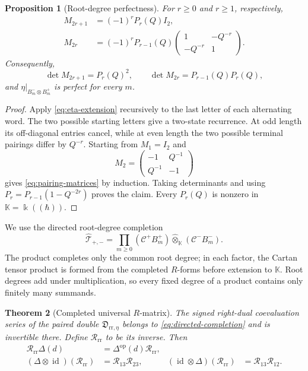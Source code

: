 \documentclass[11pt,a4paper]{article}
\newcommand{\kk}{\Bbbk}
\newcommand{\hK}{\mathbb K}
\newcommand{\ot}{\otimes}
\newcommand{\hot}{\widehat\otimes}
\newcommand{\id}{\operatorname{id}}
\newtheorem{theorem}{Theorem}[section]
\newtheorem{proposition}[theorem]{Proposition}
\theoremstyle{definition}
\theoremstyle{remark}
\begin{document}
\begin{proposition}[Root-degree perfectness]\label{prop:perfect-pairing}
For \(r\geq0\) and \(r\geq1\), respectively,
\begin{equation}\label{eq:pairing-matrices}
\begin{aligned}
 M_{2r+1}&=(-1)^rP_r(Q)I_2,\\
 M_{2r}&=(-1)^rP_{r-1}(Q)
 \begin{pmatrix}1&-Q^{-r}\\-Q^{-r}&1\end{pmatrix}.
\end{aligned}
\end{equation}
Consequently,
\[
 \det M_{2r+1}=P_r(Q)^2,\qquad
 \det M_{2r}=P_{r-1}(Q)P_r(Q),
\]
and \(\eta|_{B_m^-\ot B_m^+}\) is perfect for every \(m\).
\end{proposition}

\begin{proof}
Apply \eqref{eq:eta-extension} recursively to the last letter of each
alternating word.  The two possible starting letters give a two-state
recurrence.  At odd length its off-diagonal entries cancel, while at even
length the two possible terminal pairings differ by \(Q^{-r}\).  Starting
from \(M_1=I_2\) and
\[
 M_2=\begin{pmatrix}-1&Q^{-1}\\Q^{-1}&-1\end{pmatrix}
\]
gives \eqref{eq:pairing-matrices} by induction.  Taking determinants and
using \(P_r=P_{r-1}(1-Q^{-2r})\) proves the claim.  Every \(P_r(Q)\) is
nonzero in \(\hK=\kk((\hbar))\).
\end{proof}

We use the directed root-degree completion
\begin{equation}\label{eq:directed-completion}
 \widehat{\mathcal T}_{+,-}
 =
 \prod_{m\geq0}
 (\mathcal C^+B_m^+)\hot_{\hK}(\mathcal C^-B_m^-).
\end{equation}
The product completes only the common root degree; in each factor,
the Cartan tensor product is formed from the completed \(R\)-forms
before extension to \(\hK\).  Root degrees add under multiplication, so
every fixed degree of a product contains only finitely many summands.

\begin{theorem}[Completed universal \(R\)-matrix]\label{thm:universal-R}
The signed right-dual coevaluation series of the paired double
\(\mathfrak D_{\mathrm{rr},\eta}\) belongs to
\eqref{eq:directed-completion} and is invertible there.  Define
\(\mathcal R_{\mathrm{rr}}\) to be its inverse.  Then
\begin{align}
 \mathcal R_{\mathrm{rr}}\Delta(d)
 &=\Delta^{\mathrm{op}}(d)\mathcal R_{\mathrm{rr}},
 \label{eq:R-intertwines}\\
 (\Delta\ot\id)(\mathcal R_{\mathrm{rr}})
 &=\mathcal R_{13}\mathcal R_{23},&
 (\id\ot\Delta)(\mathcal R_{\mathrm{rr}})
 &=\mathcal R_{13}\mathcal R_{12}.
\label{eq:R-hexagons}
\end{align}
\end{theorem}
\end{document}
